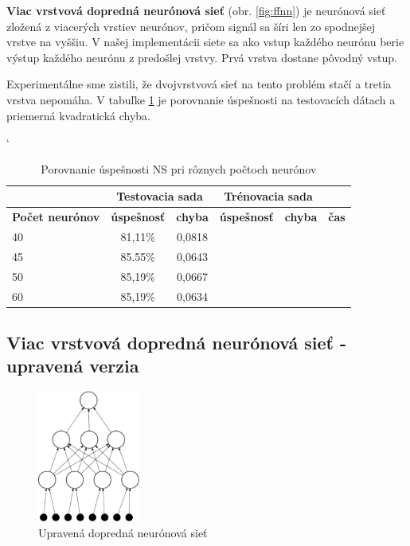 \textbf{Viac vrstvová dopredná neurónová sieť} (obr. \ref{fig:ffnn}) je neurónová sieť zložená z viacerých vrstiev neurónov, pričom signál sa šíri len zo spodnejšej vrstve na vyššiu. V našej implementácii siete sa ako vstup každého neurónu berie výstup každého neurónu z predošlej vrstvy. Prvá vrstva dostane pôvodný vstup. 

Experimentálne sme zistili, že dvojvrstvová sieť na tento problém stačí a tretia vrstva nepomáha.
V tabuľke \ref{tab:neuroncountcmp} je porovnanie úspešnosti na testovacích dátach a priemerná kvadratická chyba.

\begin{table}[h]
\catcode` %
\centering
\begin{tabular}{|l|c|c|c|c|c|}
\cline{2-5}
\multicolumn{1}{l}{} & \multicolumn{2}{|c|}{\textbf{Testovacia sada}} & \multicolumn{2}{c|}{\textbf{Trénovacia sada}} & \multicolumn{1}{l}{}\\ 
\hline
\textbf{Počet neurónov} & \textbf{úspešnosť} & \textbf{chyba} & \textbf{úspešnosť} & \textbf{chyba} & \textbf{čas} \\ \hline
40 & 81,11\% & 0,0818 & & &\\ \hline
45 & 85.55\% & 0,0643 & & &\\ \hline
50 & 85,19\% & 0,0667 & & &\\ \hline
60 & 85,19\% & 0,0634 & & &\\ 
\hline
\end{tabular}
\caption{Porovnanie úspešnosti NS pri rôznych počtoch neurónov}
\label{tab:neuroncountcmp}
\end{table}


\subsection{Viac vrstvová dopredná neurónová sieť - upravená verzia}

\begin{figure}[h]
  \begin{center}
    \includegraphics[width=0.3\textwidth]{images/dffnn}
  \end{center}
  \caption{Upravená dopredná neurónová sieť}
  \label{fig:dffnn}
\end{figure}


